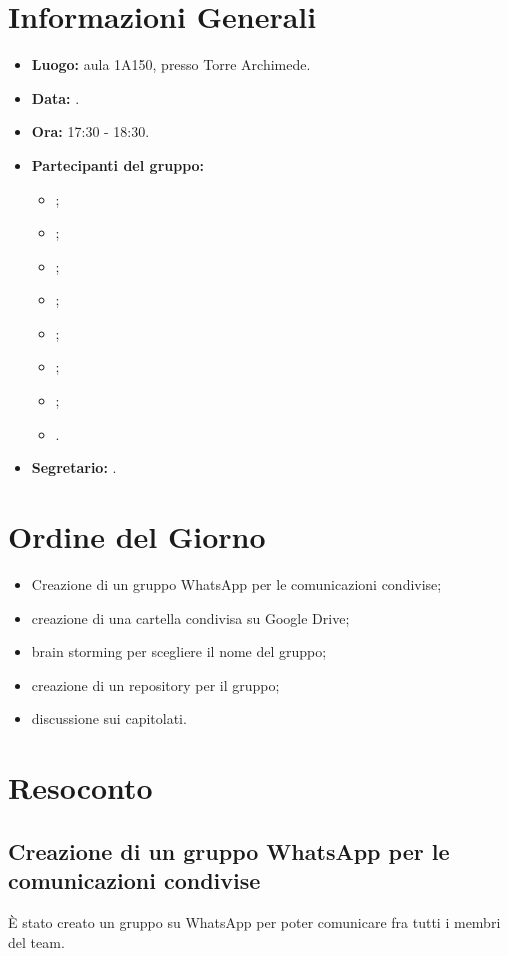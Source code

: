 \section{Informazioni Generali}
\begin{itemize}
\item \textbf{Luogo:} aula 1A150, presso Torre Archimede.
\item \textbf{Data:} \Data.
\item \textbf{Ora:} 17:30 - 18:30.
\item \textbf{Partecipanti del gruppo:}
	\begin{itemize}
		\item \AT{}; 
		\item \BR{};
		\item \CE{}; 
		\item \DF{};
		\item \LD{};
		\item \MC{};
		\item \PF{};
		\item \SE{}.
	\end{itemize} 
\item \textbf{Segretario:} \AT{}.
\end{itemize}


\section{Ordine del Giorno}
\begin{itemize}
	\item Creazione di un gruppo WhatsApp per le comunicazioni condivise; 
	\item creazione di una cartella condivisa su Google Drive;
	\item brain storming per scegliere il nome del gruppo;
	\item creazione di un repository per il gruppo;
	\item discussione sui capitolati.
\end{itemize}

\section{Resoconto}
\subsection{Creazione di un gruppo WhatsApp per le comunicazioni condivise}
È stato creato un gruppo su WhatsApp per poter comunicare fra tutti i membri del team.

